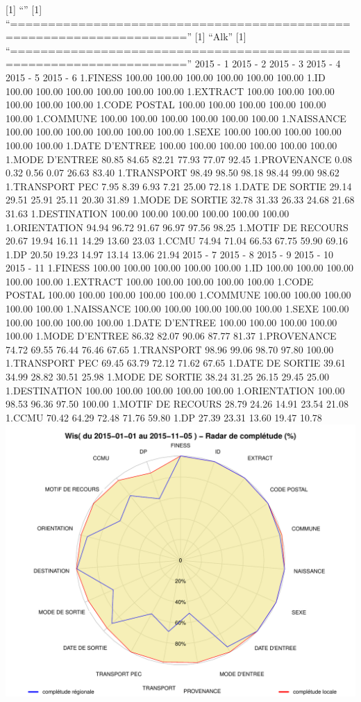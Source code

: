 \documentclass[]{article}
\begin{document}
{[}1{]} ``'' {[}1{]}
``=====================================================================''
{[}1{]} ``Alk'' {[}1{]}
``=====================================================================''
2015 - 1 2015 - 2 2015 - 3 2015 - 4 2015 - 5 2015 - 6 1.FINESS 100.00
100.00 100.00 100.00 100.00 100.00 1.ID 100.00 100.00 100.00 100.00
100.00 100.00 1.EXTRACT 100.00 100.00 100.00 100.00 100.00 100.00 1.CODE
POSTAL 100.00 100.00 100.00 100.00 100.00 100.00 1.COMMUNE 100.00 100.00
100.00 100.00 100.00 100.00 1.NAISSANCE 100.00 100.00 100.00 100.00
100.00 100.00 1.SEXE 100.00 100.00 100.00 100.00 100.00 100.00 1.DATE
D'ENTREE 100.00 100.00 100.00 100.00 100.00 100.00 1.MODE D'ENTREE 80.85
84.65 82.21 77.93 77.07 92.45 1.PROVENANCE 0.08 0.32 0.56 0.07 26.63
83.40 1.TRANSPORT 98.49 98.50 98.18 98.44 99.00 98.62 1.TRANSPORT PEC
7.95 8.39 6.93 7.21 25.00 72.18 1.DATE DE SORTIE 29.14 29.51 25.91 25.11
20.30 31.89 1.MODE DE SORTIE 32.78 31.33 26.33 24.68 21.68 31.63
1.DESTINATION 100.00 100.00 100.00 100.00 100.00 100.00 1.ORIENTATION
94.94 96.72 91.67 96.97 97.56 98.25 1.MOTIF DE RECOURS 20.67 19.94 16.11
14.29 13.60 23.03 1.CCMU 74.94 71.04 66.53 67.75 59.90 69.16 1.DP 20.50
19.23 14.97 13.14 13.06 21.94 2015 - 7 2015 - 8 2015 - 9 2015 - 10 2015
- 11 1.FINESS 100.00 100.00 100.00 100.00 100.00 1.ID 100.00 100.00
100.00 100.00 100.00 1.EXTRACT 100.00 100.00 100.00 100.00 100.00 1.CODE
POSTAL 100.00 100.00 100.00 100.00 100.00 1.COMMUNE 100.00 100.00 100.00
100.00 100.00 1.NAISSANCE 100.00 100.00 100.00 100.00 100.00 1.SEXE
100.00 100.00 100.00 100.00 100.00 1.DATE D'ENTREE 100.00 100.00 100.00
100.00 100.00 1.MODE D'ENTREE 86.32 82.07 90.06 87.77 81.37 1.PROVENANCE
74.72 69.55 76.44 76.46 67.65 1.TRANSPORT 98.96 99.06 98.70 97.80 100.00
1.TRANSPORT PEC 69.45 63.79 72.12 71.62 67.65 1.DATE DE SORTIE 39.61
34.99 28.82 30.51 25.98 1.MODE DE SORTIE 38.24 31.25 26.15 29.45 25.00
1.DESTINATION 100.00 100.00 100.00 100.00 100.00 1.ORIENTATION 100.00
98.53 96.36 97.50 100.00 1.MOTIF DE RECOURS 28.79 24.26 14.91 23.54
21.08 1.CCMU 70.42 64.29 72.48 71.76 59.80 1.DP 27.39 23.31 13.60 19.47
10.78 \includegraphics{completude_files/figure-latex/finess-9.pdf}
\end{document}
